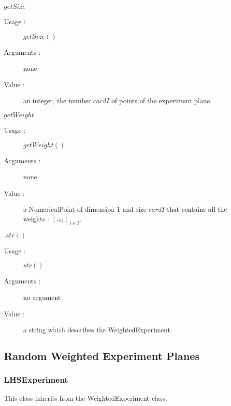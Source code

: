 \begin{description}
\begin{description}
  \item $getSize$
    \begin{description}
    \item[Usage :] $getSize()$
    \item[Arguments :] none
    \item[Value :] an integer, the number $card I$ of points of the experiment plane.
    \end{description}
    \bigskip

  \item $getWeight$
    \begin{description}
    \item[Usage :] $getWeight()$
    \item[Arguments :] none
    \item[Value :] a NumericalPoint of dimension 1 and size $cardI$ that contains all the weights : $(\omega_i)_{i \in I}$.
    \end{description}
    \bigskip

  \item $.str()$
    \begin{description}
    \item[Usage :] $str()$
    \item[Arguments :] no argument
    \item[Value :] a string which describes the WeightedExperiment.
    \end{description}

  \end{description}


\item[Links]  \rule{0pt}{1em}

\end{description}




\newpage        \subsection{Random Weighted Experiment Planes}

  \subsubsection{LHSExperiment}

This class inherits from the WeightedExperiment class.\\

